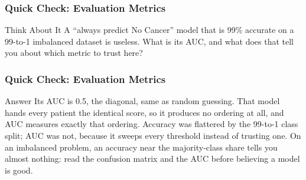 \begin{frame}[fragile]\frametitle{Quick Check: Evaluation Metrics}
\begin{block}{Think About It}
A ``always predict No Cancer'' model that is 99\% accurate on a 99-to-1 imbalanced dataset is useless. What is its AUC, and what does that tell you about which metric to trust here?
\end{block}
\end{frame}

\begin{frame}[fragile]\frametitle{Quick Check: Evaluation Metrics}
\begin{block}{Answer}
Its AUC is 0.5, the diagonal, same as random guessing. That model hands every patient the identical score, so it produces no ordering at all, and AUC measures exactly that ordering. Accuracy was flattered by the 99-to-1 class split; AUC was not, because it sweeps every threshold instead of trusting one. On an imbalanced problem, an accuracy near the majority-class share tells you almost nothing: read the confusion matrix and the AUC before believing a model is good.
\end{block}
\end{frame}

